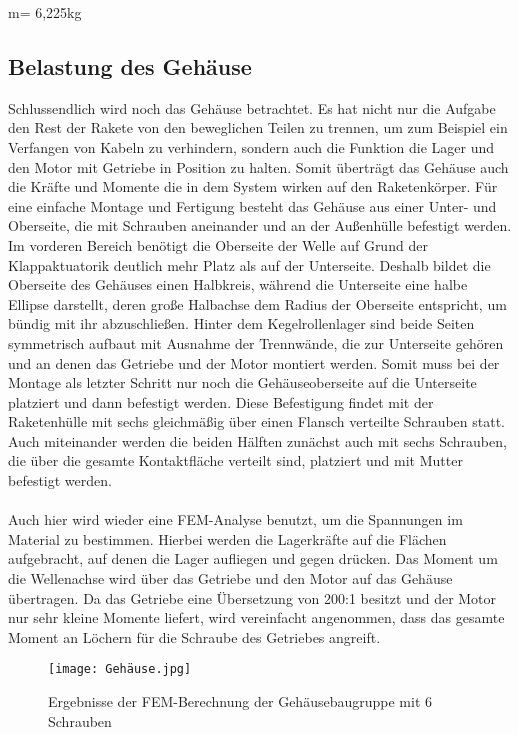 m= 6,225kg

\subsection{Belastung des Gehäuse}
Schlussendlich wird noch das Gehäuse betrachtet. Es hat nicht nur die Aufgabe den Rest der Rakete von den beweglichen Teilen zu trennen, um zum Beispiel ein Verfangen von Kabeln zu verhindern, sondern auch die Funktion die Lager und den Motor mit Getriebe in Position zu halten. Somit überträgt das Gehäuse auch die Kräfte und Momente die in dem System wirken auf den Raketenkörper. Für eine einfache Montage und Fertigung besteht das Gehäuse aus einer Unter- und Oberseite, die mit Schrauben aneinander und an der Außenhülle befestigt werden. Im vorderen Bereich benötigt die Oberseite der Welle auf Grund der Klappaktuatorik deutlich mehr Platz als auf der Unterseite. Deshalb bildet die Oberseite des Gehäuses einen Halbkreis, während die Unterseite eine halbe Ellipse darstellt, deren große Halbachse dem Radius der Oberseite entspricht, um bündig mit ihr abzuschließen. Hinter dem Kegelrollenlager sind beide Seiten symmetrisch aufbaut mit Ausnahme der Trennwände, die zur Unterseite gehören und an denen das Getriebe und der Motor montiert werden. Somit muss bei der Montage als letzter Schritt nur noch die Gehäuseoberseite auf die Unterseite platziert und dann befestigt werden.
Diese Befestigung findet mit der Raketenhülle mit sechs gleichmäßig über einen Flansch verteilte Schrauben statt. Auch miteinander werden die beiden Hälften zunächst auch mit sechs Schrauben, die über die gesamte Kontaktfläche verteilt sind, platziert und mit Mutter befestigt werden.
\\~\\
Auch hier wird wieder eine FEM-Analyse benutzt, um die Spannungen im Material zu bestimmen. Hierbei werden die Lagerkräfte auf die Flächen aufgebracht, auf denen die Lager aufliegen und gegen drücken. Das Moment um die Wellenachse wird über das Getriebe und den Motor auf das Gehäuse übertragen. Da das Getriebe eine Übersetzung von 200:1 besitzt und der Motor nur sehr kleine Momente liefert, wird vereinfacht angenommen, dass das gesamte Moment an Löchern für die Schraube des Getriebes angreift.
\begin{figure}[h] 
	\centering
	\texttt{[image: Gehäuse.jpg]}
	\caption{Ergebnisse der FEM-Berechnung der Gehäusebaugruppe mit 6 Schrauben}
\end{figure}\\

